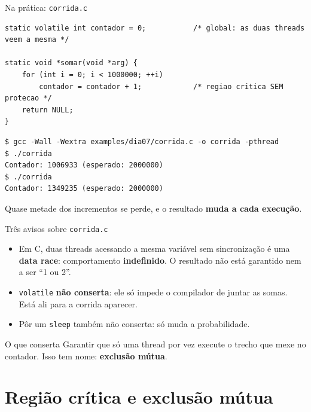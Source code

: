 \documentclass[aspectratio=169]{beamer}
\begin{document}
\begin{frame}[fragile]{Na prática: \texttt{corrida.c}}
\begin{lstlisting}[style=codigo, basicstyle=\ttfamily\scriptsize\color{termfg}]
static volatile int contador = 0;           /* global: as duas threads veem a mesma */

static void *somar(void *arg) {
    for (int i = 0; i < 1000000; ++i)
        contador = contador + 1;            /* regiao critica SEM protecao */
    return NULL;
}
\end{lstlisting}

\begin{lstlisting}[style=terminal, basicstyle=\ttfamily\scriptsize\color{termfg}]
$ gcc -Wall -Wextra examples/dia07/corrida.c -o corrida -pthread
$ ./corrida
Contador: 1006933 (esperado: 2000000)
$ ./corrida
Contador: 1349235 (esperado: 2000000)
\end{lstlisting}

\small Quase metade dos incrementos se perde, e o resultado \textbf{muda a cada execução}.
\end{frame}

\begin{frame}{Três avisos sobre \texttt{corrida.c}}
\begin{itemize}
    \item Em C, duas threads acessando a mesma variável sem sincronização é uma \textbf{data race}: comportamento \textbf{indefinido}. O resultado não está garantido nem a ser ``1 ou 2''.
    \item \texttt{volatile} \textbf{não conserta}: ele só impede o compilador de juntar as somas. Está ali para a corrida aparecer.
    \item Pôr um \texttt{sleep} também não conserta: só muda a probabilidade.
\end{itemize}

\vspace{0.6em}
\begin{exampleblock}{O que conserta}
Garantir que só uma thread por vez execute o trecho que mexe no contador. Isso tem nome: \textbf{exclusão mútua}.
\end{exampleblock}
\end{frame}

\section{Região crítica e exclusão mútua}
\end{document}
